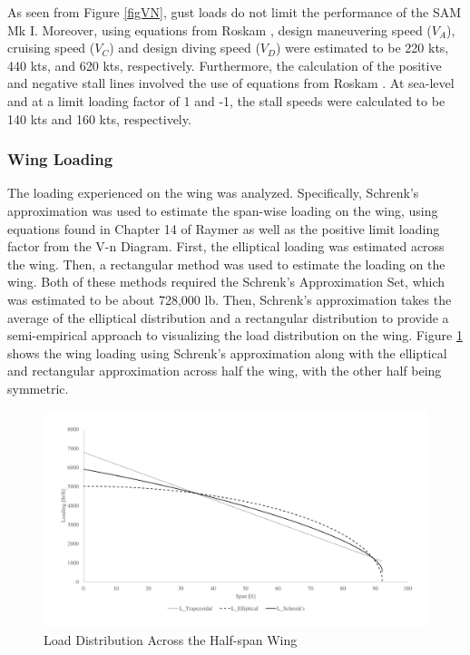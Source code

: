 As seen from Figure \ref{figVN}, gust loads do not limit the performance of the SAM Mk I. Moreover, using equations from Roskam \cite{roskam_5}, design maneuvering speed ($V_{A}$), cruising speed ($V_{C}$) and design diving speed ($V_{D}$) were estimated to be 220 kts, 440 kts, and 620 kts, respectively. Furthermore, the calculation of the positive and negative stall lines involved the use of equations from Roskam \cite{roskam_5}. At sea-level and at a limit loading factor of 1 and -1, the stall speeds were calculated to be 140 kts and 160 kts, respectively.

\subsubsection{Wing Loading}
\label{winlod}
The loading experienced on the wing was analyzed. Specifically, Schrenk's approximation was used to estimate the span-wise loading on the wing, using equations found in Chapter 14 of Raymer \cite{raymer} as well as the positive limit loading factor from the V-n Diagram. First, the elliptical loading was estimated across the wing. Then, a rectangular method was used to estimate the loading on the wing. Both of these methods required the Schrenk's Approximation Set, which was estimated to be about 728,000 lb. Then, Schrenk's approximation takes the average of the elliptical distribution and a rectangular distribution to provide a semi-empirical approach to visualizing the load distribution on the wing. Figure \ref{schrenk} shows the wing loading using Schrenk's approximation along with the elliptical and rectangular approximation across half the wing, with the other half being symmetric. 

\begin{figure}[H]
    \centering
    \includegraphics[width=1.0\linewidth]{Photos/Schrenks.pdf}
    \caption{Load Distribution Across the Half-span Wing}
    \label{schrenk}
\end{figure}

